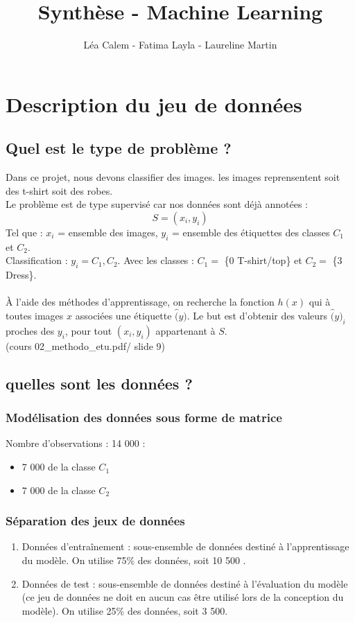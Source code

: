 \documentclass[a4paper,11pt]{article}
\title{Synthèse - Machine Learning}
\author{Léa Calem - Fatima Layla - Laureline Martin}
\begin{document}
\maketitle
	
\section{Description du jeu de données}
	\subsection{Quel est le type de problème ?}
		Dans ce projet, nous devons classifier des images. les images reprensentent soit des t-shirt soit des robes.\\
		Le problème est de type supervisé car nos données sont déjà annotées :
		$$ S = {(x_i, y_i)} $$
		Tel que : $x_i$ = ensemble des images, 
		$y_i$ = ensemble des étiquettes des classes $C_1$ et $C_2$.\\
		Classification : $y_i = {C_1, C_2}$.
		Avec les classes : $C_1 =$ \{0 T-shirt/top\} et $C_2 =$ \{3 Dress\}.\\
		\\
		À l’aide des méthodes d’apprentissage, on recherche la fonction $h(x)$ qui à toutes images $x$ associées une étiquette $\hat(y)$. Le but est d’obtenir des valeurs $\hat(y)_i$ proches des $y_i$, pour tout $(x_i, y_i)$ appartenant à $S$.\\
		(cours 02\_methodo\_etu.pdf/ slide 9)

	\subsection{quelles sont les données ?}
		\subsubsection{Modélisation des données sous forme de matrice}
			Nombre d’observations : 14 000 :
			\begin{itemize}
				\item 7 000 de la classe $C_1$
				\item 7 000 de la classe $C_2$
			\end{itemize}
		\subsubsection{Séparation des jeux de données}
			\begin{enumerate}
				\item Données d’entraînement : sous-ensemble de données destiné à l’apprentissage du modèle. On utilise 75\% des données, soit 10 500 .
				\item Données de test : sous-ensemble de données destiné à l’évaluation du modèle (ce jeu de données ne doit en aucun cas être utilisé lors de la conception du modèle). On utilise 25\% des données, soit 3 500.
			\end{enumerate}
	
\end{document}
